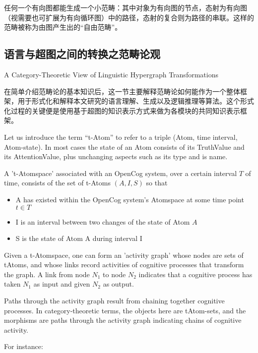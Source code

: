 任何一个有向图都能生成一个小范畴：其中对象为有向图的节点，态射为有向图（视需要也可扩展为有向循环图）中的路径，态射的复合则为路径的串联。这样的范畴被称为由图产生出的“自由范畴”。


\subsection{语言与超图之间的转换之范畴论观}{A Category-Theoretic View of Linguistic Hypergraph Transformations}

在简单介绍范畴论的基本知识后，这一节主要解释范畴论如何能作为一个整体框架，用于形式化和解释本文研究的语言理解、生成以及逻辑推理等算法。这个形式化过程的关键便是使用基于超图的知识表示方式来做为各模块的共同知识表示框架。


Let us introduce the term ``t-Atom'' to refer to a triple (Atom, time interval, Atom-state).   In most cases the state of an Atom consists of its TruthValue and its AttentionValue, plus unchanging aspects such as its type and is name.

A 't-Atomspace' associated with an OpenCog system, over a certain interval $T$ of time, consists of the set of t-Atoms $(A,I,S)$ so that

\begin{itemize}
\item A has existed within the OpenCog system's Atomspace at some time point $t \in T$
\item I is an interval between two changes of the state of Atom $A$
\item S is the state of Atom A during interval I
\end{itemize}

Given a t-Atomspace, one can form an 'activity graph' whose nodes are sets of tAtoms, and whose links record activities of cognitive processes that transform the graph.  A link from node $N_1$ to node $N_2$ indicates that a cognitive process has taken $N_1$ as input and given $N_2$ as output.   

Paths through the activity graph result from chaining together cognitive processes.  In category-theoretic terms, the objects here are tAtom-sets, and the morphisms are paths through the activity graph indicating chains of cognitive activity.

For instance:

